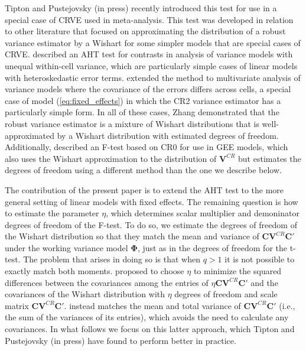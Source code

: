 \documentclass[12pt]{article}\usepackage[]{graphicx}\usepackage[]{color}
\newcommand{\bm}{\mathbf}
\newcommand{\bs}{\boldsymbol}
\begin{document}
Tipton and Pustejovsky (in press) recently introduced this test for use in a special case of CRVE used in meta-analysis. 
This test was developed in relation to other literature that focused on approximating the distribution of a robust variance estimator by a Wishart for some simpler models that are special cases of CRVE. 
\citet{Zhang2013tests, Zhang2012twowayANOVA} described an AHT test for contrasts in analysis of variance models with unequal within-cell variance, which are particularly simple cases of linear models with heteroskedastic error terms. 
\citet{Zhang2012MANOVA} extended the method to multivariate analysis of variance models where the covariance of the errors differs across cells, a special case of model (\ref{eq:fixed_effects}) in which the CR2 variance estimator has a particularly simple form. In all of these cases, Zhang demonstrated that the robust variance estimator is a mixture of Wishart distributions that is well-approximated by a Wishart distribution with estimated degrees of freedom. 
Additionally, \citet{Pan2002small} described an F-test based on CR0 for use in GEE models, which also uses the Wishart approximation to the distribution of $\bm{V}^{CR}$ but estimates the degrees of freedom using a different method than the one we describe below.

The contribution of the present paper is to extend the AHT test to the more general setting of linear models with fixed effects. 
The remaining question is how to estimate the parameter $\eta$, which determines scalar multiplier and demoninator degrees of freedom of the F-test. 
To do so, we estimate the degrees of freedom of the Wishart distribution so that they match the mean and variance of $\bm{C}\bm{V}^{CR} \bm{C}'$ under the working variance model $\bs\Phi$, just as in the degrees of freedom for the t-test. 
The problem that arises in doing so is that when $q > 1$ it is not possible to exactly match both moments. 
\cite{Pan2002small} proposed to choose $\eta$ to minimize the squared differences between the covariances among the entries of $\eta \bm{C}\bm{V}^{CR}\bm{C}'$ and the covariances of the Wishart distribution with $\eta$ degrees of freedom and scale matrix $\bm{C}\bm{V}^{CR}\bm{C}'$. 
\citet{Zhang2012MANOVA} instead matches the mean and total variance of $\bm{C}\bm{V}^{CR}\bm{C}'$ (i.e., the sum of the variances of its entries), which avoids the need to calculate any covariances. 
In what follows we focus on this latter approach, which Tipton and Pustejovsky (in press) have found to perform better in practice.
\end{document}
